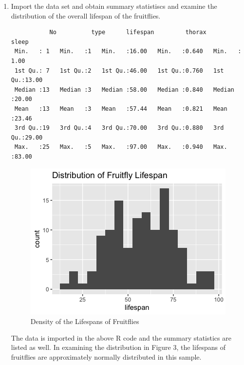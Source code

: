 \documentclass[12pt,letterpaper]{article}
\begin{document}
\begin{enumerate}
	
	\item
	Import the data set and obtain summary statistiscs and examine the distribution of the overall lifespan of the fruitflies.  
	
	 	
	
	\begin{verbatim}
	       No          type      lifespan         thorax          sleep      
 Min.   : 1   Min.   :1   Min.   :16.00   Min.   :0.640   Min.   : 1.00  
 1st Qu.: 7   1st Qu.:2   1st Qu.:46.00   1st Qu.:0.760   1st Qu.:13.00 
 Median :13   Median :3   Median :58.00   Median :0.840   Median :20.00  
 Mean   :13   Mean   :3   Mean   :57.44   Mean   :0.821   Mean   :23.46  
 3rd Qu.:19   3rd Qu.:4   3rd Qu.:70.00   3rd Qu.:0.880   3rd Qu.:29.00  
 Max.   :25   Max.   :5   Max.   :97.00   Max.   :0.940   Max.   :83.00
	\end{verbatim}
	
	\begin{figure}[h!]
		\caption{\footnotesize{Density of the Lifespans of Fruitflies}}
		\vspace{.5cm}
		\centering
		\label{fig:lifespan}
		\includegraphics[width=1\textwidth]{./PS2_Graph_2.png}
	\end{figure}	
	
	The data is imported in the above R code and the summary statistics are listed as well. In examining the distribution in Figure 3, the lifespans of fruitflies are approximately normally distributed in this sample.
	

\end{enumerate}
\end{document}
